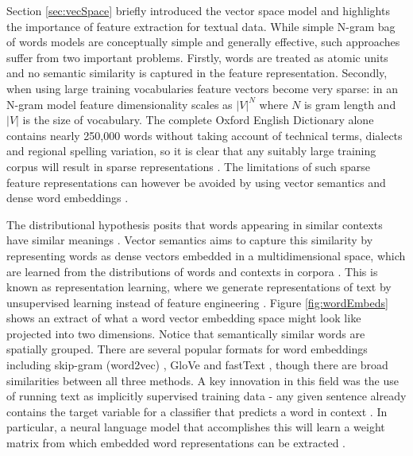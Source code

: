\documentclass[Dissertation.tex]{subfiles}
\begin{document}
Section \ref{sec:vecSpace} briefly introduced the vector space model and highlights the importance of feature extraction for textual data. While simple N-gram bag of words models are conceptually simple and generally effective, such approaches suffer from two important problems. Firstly, words are treated as atomic units and no semantic similarity is captured in the feature representation. Secondly, when using large training vocabularies feature vectors become very sparse: in an N-gram model feature dimensionality scales as $ |V|^N $ where $ N $ is gram length and $ |V|  $ is the size of vocabulary.  The complete Oxford English Dictionary alone contains nearly 250,000 words \cite{HowManyWords} without taking account of technical terms, dialects and regional spelling variation, so it is clear that any suitably large training corpus will result in sparse representations \cite{jurafskySpeechLanguageProcessing}. The limitations of such sparse feature representations can however be avoided by using vector semantics and dense word embeddings \cite{jurafskySpeechLanguageProcessing}.

The distributional hypothesis  posits that words appearing in similar contexts have similar meanings \cite{sahlgren2008distributional}. Vector semantics aims to capture this similarity by representing words as dense vectors embedded in a multidimensional space, which are learned from the distributions of words and contexts in corpora \cite{jurafskySpeechLanguageProcessing}. This is known as representation learning, where we generate representations of text by unsupervised learning instead of feature engineering \cite{jurafskySpeechLanguageProcessing}. Figure \ref{fig:wordEmbeds} shows an extract of what a word vector embedding space might look like projected into two dimensions. Notice that semantically similar words are spatially grouped. There are several popular formats for word embeddings including skip-gram (word2vec) \cite{mikolovEfficientEstimationWord2013}, GloVe \cite{penningtonGloveGlobalVectors2014} and fastText \cite{joulinBagTricksEfficient2016}, though there are broad similarities between all three methods. A key innovation in this field was the use of running text as implicitly supervised training data - any given sentence already contains the target variable for a classifier that predicts a word in context \cite{jurafskySpeechLanguageProcessing}. In particular, a neural language model that accomplishes this will learn a weight matrix from which embedded word representations can be extracted \cite{jurafskySpeechLanguageProcessing}. 
\end{document}
